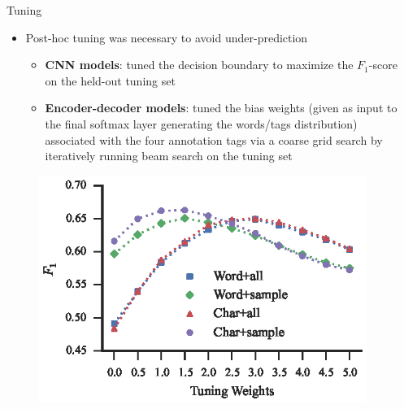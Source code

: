 \documentclass[final]{beamer}
\newlength{\sepwid}
\newlength{\onecolwid}
\begin{document}
\begin{frame}[t]
\begin{columns}[t]
  \begin{column}{\sepwid}\end{column}			%
  \begin{column}{\onecolwid}
      \begin{block}{Tuning}
       	\begin{itemize}
			\item Post-hoc tuning was necessary to avoid under-prediction
			\begin{itemize}
				\item \textbf{CNN models}: tuned the decision boundary to maximize the $F_1$-score on the held-out tuning set
				\item \textbf{Encoder-decoder models}: tuned the bias weights (given as input to the final softmax layer generating the words/tags distribution) associated with the four annotation tags via a coarse grid search by iteratively running beam search on the tuning set
			\end{itemize}
       	\end{itemize}
        \begin{figure}[htb]
            \centering
            \includegraphics[width=.7\columnwidth]{figures/f1}

\end{figure}
\end{block}
\end{column}
\end{columns}
\end{frame}
\end{document}
